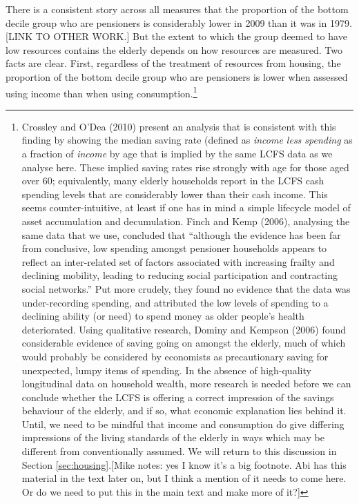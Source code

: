 There is a consistent story across all measures that the proportion of the bottom decile group who are pensioners is considerably lower in 2009 than it was in 1979. [LINK TO OTHER WORK.] But the extent to which the group deemed to have low resources contains the elderly depends on how resources are measured. Two facts are clear. First, regardless of the treatment of resources from housing, the proportion of the bottom decile group who are pensioners is lower when assessed using income than when using consumption.\footnote{Crossley and O'Dea (2010) present an analysis that is consistent with this finding by showing the median saving rate (defined as \emph{income less spending} as a fraction of \emph{income} by age that is implied by the same LCFS data as we analyse here. These implied saving rates rise strongly with age for those aged over 60; equivalently, many elderly households report in the LCFS cash spending levels that are considerably lower than their cash income. This seems counter-intuitive, at least if one has in mind a simple lifecycle model of asset accumulation and decumulation. Finch and Kemp (2006), analysing the same data that we use, concluded that ``although the evidence has been far from conclusive, low spending amongst pensioner households appears to reflect an inter-related set of factors associated with increasing frailty and declining mobility, leading to reducing social participation and contracting social networks.'' Put more crudely, they found no evidence that the data was under-recording spending, and attributed the low levels of spending to a declining ability (or need) to spend money as older people's health deteriorated. Using qualitative research, Dominy and Kempson (2006) found considerable evidence of saving going on amongst the elderly, much of which would probably be considered by economists as precautionary saving for unexpected, lumpy items of spending. In the absence of high-quality longitudinal data on household wealth, more research is needed before we can conclude whether the LCFS is offering a correct impression of the savings behaviour of the elderly, and if so, what economic explanation lies behind it. Until, we need to be mindful that income and consumption do give differing impressions of the living standards of the elderly in ways which may be different from conventionally assumed. We will return to this discussion in Section \ref{sec:housing}.[Mike notes: yes I know it's a big footnote. Abi has this material in the text later on, but I think a mention of it needs to come here. Or do we need to put this in the main text and make more of it?]}

